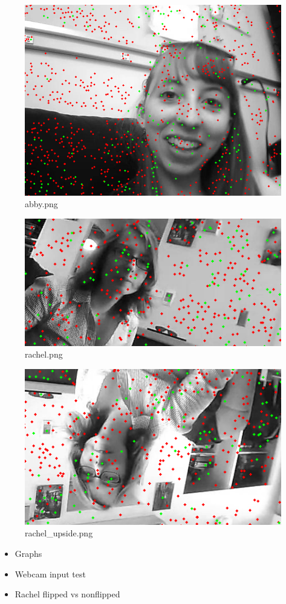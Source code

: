 \documentclass[11pt, twocolumn]{article}
\begin{document}
\begin{figure}[h!]
    \centering
    \includegraphics[scale=0.3]{./imgs/abby.png}
    \caption{
        abby.png
    }
\end{figure}

\begin{figure}[h!]
    \centering
    \includegraphics[scale=0.3]{./imgs/rachel.png}
    \caption{
        rachel.png
    }
\end{figure}

\begin{figure}[h!]
    \centering
    \includegraphics[scale=0.3]{./imgs/rachel_upside.png}
    \caption{
        rachel\_upside.png
    }
\end{figure}

\begin{itemize}
    \item Graphs
    \item Webcam input test
    \item Rachel flipped vs nonflipped
\end{itemize}
\end{document}
